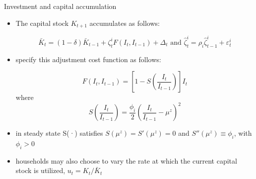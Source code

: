 \documentclass[9pt]{beamer}
\begin{document}
\begin{frame}{Investment and capital accumulation}
\label{frame5}
\begin{itemize}
    
    \item The capital stock $K_{t+1}$ accumulates as follows:
    
     $$\bar{K}_{t}=(1-\delta) \bar{K}_{t-1}+\zeta_{t}^{i} F\left(I_{t}, I_{t-1}\right)+\Delta_{t} \text {  and  } \hat{\zeta}_{t}^{i}=\rho_{i} \hat{\zeta}_{t-1}^{i}+\varepsilon_{t}^{i} $$
    
    
    \item \textcolor{red}{\citet{Christiano:2005}} specify this adjustment cost function as follows:
    
    $$
F\left(I_{t}, I_{t-1}\right)=\left[1-S\left(\frac{I_{t}}{I_{t-1}}\right)\right] I_{t}
$$
where
$$
S\left(\frac{I_{t}}{I_{t-1}}\right)=\frac{\phi_{i}}{2}\left(\frac{I_{t}}{I_{t-1}}-\mu^{z}\right)^{2}
$$
    
    \item  in steady state S(·) satisfies $S(\mu^z) = S'(\mu^z) = 0$ and $S''(\mu^z) \equiv \phi_i $, with $\phi_i > 0$ 
    
    \item households may also choose to vary the rate at which the current capital stock is utilized, $u_t = K_t/ \bar{K}_t$
    
\end{itemize}


\hyperlink{DomUnit5}{}

\end{frame}
\end{document}
